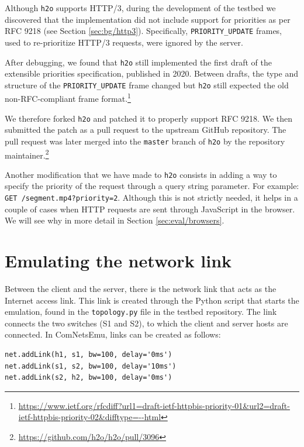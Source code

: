 Although \texttt{h2o} supports HTTP/3, during the development of the testbed we discovered that the implementation did not include support for priorities as per RFC 9218 (see Section \ref{sec:bg/http3}). Specifically, \texttt{PRIORITY\_UPDATE} frames, used to re-prioritize HTTP/3 requests, were ignored by the server.

After debugging, we found that \texttt{h2o} still implemented the first draft of the extensible priorities specification, published in 2020. Between drafts, the type and structure of the \texttt{PRIORITY\_UPDATE} frame changed but \texttt{h2o} still expected the old non-RFC-compliant frame format.\footnote{\url{https://www.ietf.org/rfcdiff?url1=draft-ietf-httpbis-priority-01&url2=draft-ietf-httpbis-priority-02&difftype=--html}}

We therefore forked \texttt{h2o} and patched it to properly support RFC 9218. We then submitted the patch as a pull request to the upstream GitHub repository. The pull request was later merged into the \texttt{master} branch of \texttt{h2o} by the repository maintainer.\footnote{\url{https://github.com/h2o/h2o/pull/3096}}

Another modification that we have made to \texttt{h2o} consists in adding a way to specify the priority of the request through a query string parameter. For example: \texttt{GET /segment.mp4?priority=2}. Although this is not strictly needed, it helps in a couple of cases when HTTP requests are sent through JavaScript in the browser. We will see why in more detail in Section \ref{sec:eval/browsers}.

\section{Emulating the network link}
\label{sec:testbed/network}

Between the client and the server, there is the network link that acts as the Internet access link. This link is created through the Python script that starts the emulation, found in the \texttt{topology.py} file in the testbed repository. The link connects the two switches (S1 and S2), to which the client and server hosts are connected. In ComNetsEmu, links can be created as follows:

\begin{verbatim}
net.addLink(h1, s1, bw=100, delay='0ms')
net.addLink(s1, s2, bw=100, delay='10ms')
net.addLink(s2, h2, bw=100, delay='0ms')
\end{verbatim}

